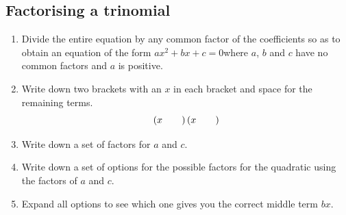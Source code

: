             \subsection*{Factorising a trinomial}
            \nopagebreak
        \label{m39394*id276561}\begin{enumerate}[itemsep=5pt, label=\textbf{\arabic*}. ] 
            \label{m39394*uid21}\item Divide the entire equation by any common factor of the coefficients so as to obtain an equation of the form $a{x}^{2}+bx+c=0$\hspace{1ex}where $a$, $b$ and $c$ have no common factors and $a$ is positive.
\label{m39394*uid22}\item Write down two brackets with an $x$ in each bracket and space for the remaining terms.
\label{m39394*uid23}\nopagebreak\noindent{}
    \begin{equation}
    \left(x\phantom{\rule{2.em}{0ex}}\right)\left(x\phantom{\rule{2.em}{0ex}}\right)
      \end{equation}
    \label{m39394*uid24}\item Write down a set of factors for $a$ and $c$.
\label{m39394*uid25}\item Write down a set of options for the possible factors for the quadratic using the factors of $a$ and $c$.
\label{m39394*uid26}\item Expand all options to see which one gives you the correct middle term $bx$.
\end{enumerate}
        \label{m39394*id276779}


\par
 
